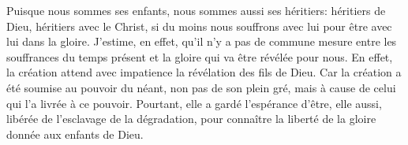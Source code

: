 Puisque nous sommes ses enfants, nous sommes aussi ses héritiers:
	héritiers de Dieu, héritiers avec le Christ,
	si du moins nous souffrons avec lui pour être avec lui dans la gloire.
J’estime, en effet, qu’il n’y a pas de commune mesure
		entre les souffrances du temps présent
	et la gloire qui va être révélée pour nous.
En effet, la création attend avec impatience la révélation des fils de Dieu.
Car la création a été soumise au pouvoir du néant,
	non pas de son plein gré, mais à cause de celui qui l’a livrée à ce pouvoir.
Pourtant, elle a gardé l’espérance d’être, elle aussi,
	libérée de l’esclavage de la dégradation,
	pour connaître la liberté de la gloire donnée aux enfants de Dieu.
